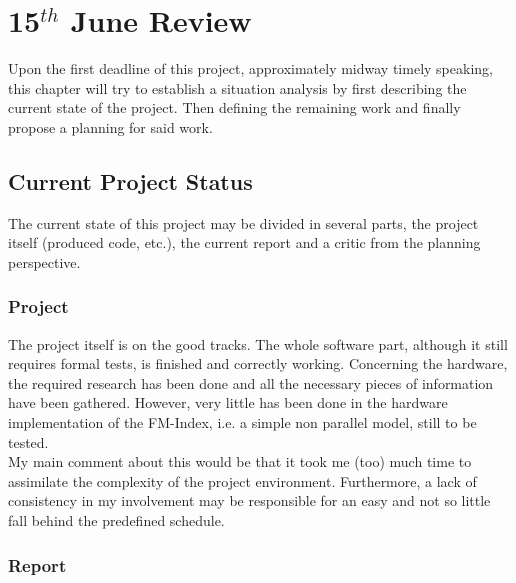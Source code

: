 
\chapter{15$^{th}$ June Review} %

\label{ChapterTemp} %

Upon the first deadline of this project, approximately midway timely speaking, this chapter will try to establish a situation analysis by first describing the current state of the project. Then defining the remaining work and finally propose a planning for said work.

\section{Current Project Status}

The current state of this project may be divided in several parts, the project itself (produced code, etc.), the current report and a critic from the planning perspective.

\subsection{Project}

The project itself is on the good tracks. The whole software part, although it still requires formal tests, is finished and correctly working. Concerning the hardware, the required research has been done and all the necessary pieces of information have been gathered. However, very little has been done in the hardware implementation of the FM-Index, i.e. a simple non parallel model, still to be tested. \\

My main comment about this would be that it took me (too) much time to assimilate the complexity of the project environment. Furthermore, a lack of consistency in my involvement may be responsible for an easy and not so little fall behind the predefined schedule.

\subsection{Report}

